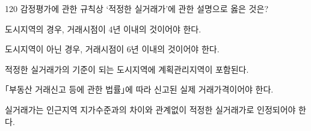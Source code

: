 \begin{question}{120}
감정평가에 관한 규칙상 ‘적정한 실거래가’에 관한 설명으로 옳은 것은?
\begin{choices}
  \item 도시지역의 경우, 거래시점이 4년 이내의 것이어야 한다.
  \item 도시지역이 아닌 경우, 거래시점이 6년 이내의 것이어야 한다.
  \item 적정한 실거래가의 기준이 되는 도시지역에 계획관리지역이 포함된다.
  \item ｢부동산 거래신고 등에 관한 법률｣에 따라 신고된 실제 거래가격이어야 한다.
  \item 실거래가는 인근지역 지가수준과의 차이와 관계없이 적정한 실거래가로 인정되어야 한다.
\end{choices}
\end{question}
